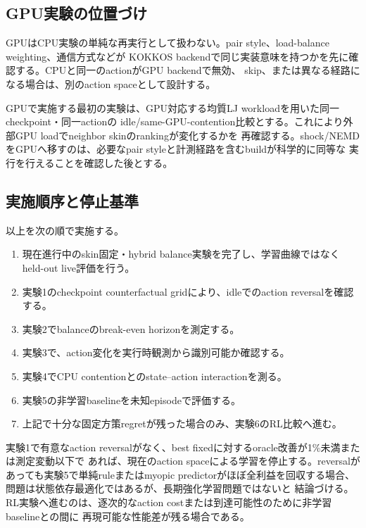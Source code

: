 \subsection{GPU実験の位置づけ}

GPUはCPU実験の単純な再実行として扱わない。pair style、load-balance weighting、通信方式などが
KOKKOS backendで同じ実装意味を持つかを先に確認する。CPUと同一のactionがGPU backendで無効、
skip、または異なる経路になる場合は、別のaction spaceとして設計する。

GPUで実施する最初の実験は、GPU対応する均質LJ workloadを用いた同一checkpoint・同一actionの
idle/same-GPU-contention比較とする。これにより外部GPU loadでneighbor skinのrankingが変化するかを
再確認する。shock/NEMDをGPUへ移すのは、必要なpair styleと計測経路を含むbuildが科学的に同等な
実行を行えることを確認した後とする。

\subsection{実施順序と停止基準}

以上を次の順で実施する。
\begin{enumerate}
  \item 現在進行中のskin固定・hybrid balance実験を完了し、学習曲線ではなくheld-out live評価を行う。
  \item 実験1のcheckpoint counterfactual gridにより、idleでのaction reversalを確認する。
  \item 実験2でbalanceのbreak-even horizonを測定する。
  \item 実験3で、action変化を実行時観測から識別可能か確認する。
  \item 実験4でCPU contentionとのstate--action interactionを測る。
  \item 実験5の非学習baselineを未知episodeで評価する。
  \item 上記で十分な固定方策regretが残った場合のみ、実験6のRL比較へ進む。
\end{enumerate}

実験1で有意なaction reversalがなく、best fixedに対するoracle改善が1\%未満または測定変動以下で
あれば、現在のaction spaceによる学習を停止する。reversalがあっても実験5で単純ruleまたはmyopic
predictorがほぼ全利益を回収する場合、問題は状態依存最適化ではあるが、長期強化学習問題ではないと
結論づける。RL実験へ進むのは、逐次的なaction costまたは到達可能性のために非学習baselineとの間に
再現可能な性能差が残る場合である。
